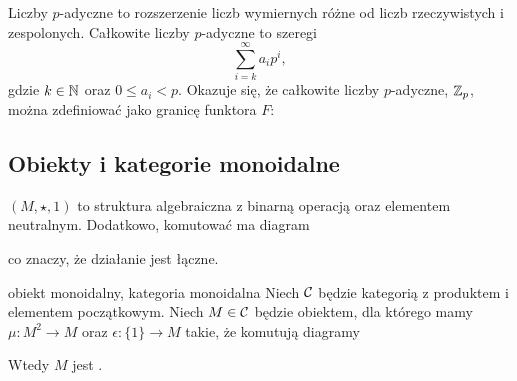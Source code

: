 {\begin{example}
  Liczby $p$-adyczne to rozszerzenie liczb wymiernych różne od liczb rzeczywistych i zespolonych. Całkowite liczby $p$-adyczne to szeregi
  $$\sum_{i=k}^\infty a_ip^i,$$
  gdzie $k\in\mathbb{N}$ oraz $0\leq a_i < p$. Okazuje się, że całkowite liczby $p$-adyczne, $\mathbb{Z}_p$, można zdefiniować jako granicę funktora $F$:
  \begin{center}
  \end{center}
\end{example}

\subsection{Obiekty i kategorie monoidalne}

 $(M, \star, 1)$ to struktura algebraiczna z binarną operacją oraz elementem neutralnym. Dodatkowo, komutować ma diagram 
\begin{center}
\end{center}
co znaczy, że działanie jest łączne.

\begin{definition}{obiekt monoidalny, kategoria monoidalna}{}
  Niech $\mathcal{C}$ będzie kategorią z produktem i elementem początkowym. Niech $M\in \mathcal{C}$ będzie obiektem, dla którego mamy $\mu:M^2\to M$ oraz $\epsilon: \{1\}\to M$ takie, że komutują diagramy
  \begin{center}
  \end{center}
  \begin{center}
  \end{center}
  Wtedy $M$ jest .
  

\end{definition}}

